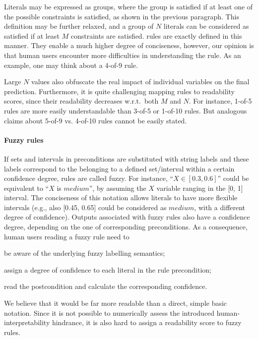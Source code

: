 \documentclass[sigconf]{acmart}
\begin{document}
Literals may be expressed as groups, where the group is satisfied if at least one of the possible constraints is satisfied, as shown in the previous paragraph.
%
This definition may be further relaxed, and a group of $N$ literals can be considered as satisfied if at least $M$ constraints are satisfied.
%
\mofn{} rules are exactly defined in this manner.
%
They enable a much higher degree of conciseness, however, our opinion is that human users encounter more difficulties in understanding the rule.
%
As an example, one may think about a 4-of-9 rule.

Large $N$ values also obfuscate the real impact of individual variables on the final prediction.
%
Furthermore, it is quite challenging mapping \mofn{} rules to readability scores, since their readability decreases w.r.t.\ both $M$ and $N$.
%
For instance, 1-of-5 rules are more easily understandable than 3-of-5 or 1-of-10 rules.
%
But analogous claims about 5-of-9 vs. 4-of-10 rules cannot be easily stated.

\paragraph{Fuzzy rules}

If sets and intervals in preconditions are substituted with string labels and these labels correspond to the belonging to a defined set/interval within a certain confidence degree, rules are called fuzzy.
%
For instance, ``$X \in [0.3, 0.6]$'' could be equivalent to ``$X$ is $medium$'', by assuming the $X$ variable ranging in the [0, 1] interval.
%
The conciseness of this notation allows literals to have more flexible intervals (e.g., also [0.45, 0.65] could be considered as $medium$, with a different degree of confidence).
%
Outputs associated with fuzzy rules also have a confidence degree, depending on the one of corresponding preconditions.
%
As a consequence, human users reading a fuzzy rule need to
%
\begin{inlinelist}
	\item be aware of the underlying fuzzy labelling semantics;
	\item assign a degree of confidence to each literal in the rule precondition;
	\item read the postcondition and calculate the corresponding confidence.
\end{inlinelist}
%
We believe that it would be far more readable than a direct, simple basic notation.
%
Since it is not possible to numerically assess the introduced human-interpretability hindrance, it is also hard to assign a readability score to fuzzy rules.
\end{document}
